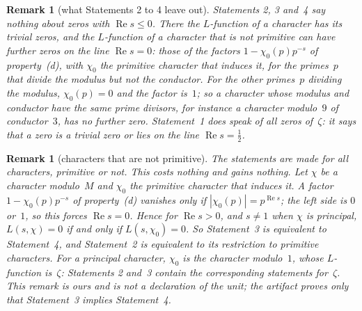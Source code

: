 \documentclass[11pt,a4paper]{article}
\newcommand{\m}[1]{\mbox{$#1$}}        %
\theoremstyle{plainx}
\theoremstyle{uprightx}
\newtheorem{remark}[theorem]{Remark}
\newcommand{\re}{\operatorname{Re}}
\begin{document}
\begin{remark}[what Statements 2 to 4 leave out]\label{r:left}
Statements 2, 3 and~4 say nothing about zeros with \m{\re s\le0}. There the $L$-function of a character has its
trivial zeros, and the $L$-function of a character that is not primitive can have further zeros on the line
\m{\re s=0}: those of the factors \m{1-\chi_0(p)p^{-s}} of property~(d), with $\chi_0$ the primitive character
that induces it, for the primes~$p$ that divide the modulus but not the conductor. For the other primes~$p$
dividing the modulus, \m{\chi_0(p)=0} and the factor is~$1$; so a character whose modulus and conductor have the
same prime divisors, for instance a character modulo~$9$ of conductor~$3$, has no further zero. Statement~1 does
speak of all zeros
of~$\zeta$: it says that a zero is a trivial zero or lies on the line \m{\re s=\tfrac12}.
\end{remark}

\begin{remark}[characters that are not primitive]\label{r:imprimitive}
The statements are made for all characters, primitive or not. This costs nothing and gains nothing. Let $\chi$ be a
character modulo~$M$ and $\chi_0$ the primitive character that induces it. A factor \m{1-\chi_0(p)p^{-s}} of
property~(d) vanishes only if \m{|\chi_0(p)|=p^{\re s}}; the left side is $0$ or~$1$, so this forces
\m{\re s=0}. Hence for \m{\re s>0}, and \m{s\ne1} when $\chi$ is principal, \m{L(s,\chi)=0} if and only if
\m{L(s,\chi_0)=0}. So Statement~3 is equivalent to Statement~4, and Statement~2 is equivalent to its restriction
to primitive characters. For a principal character, $\chi_0$ is the character modulo~$1$, whose $L$-function
is~$\zeta$: Statements 2 and~3 contain the corresponding statements for~$\zeta$. This remark is ours and is not a
declaration of the unit; the artifact proves only that Statement~3 implies Statement~4.
\end{remark}
\end{document}
